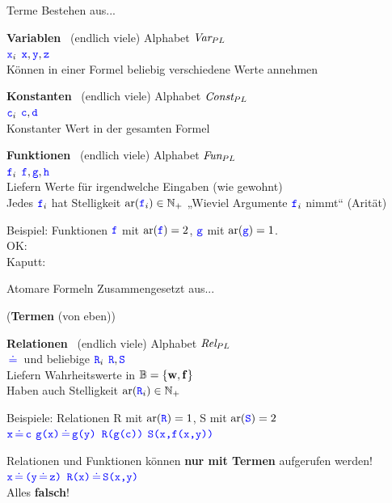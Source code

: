 \begin{frame}{Terme}
	Bestehen aus... \\
	\medskip
	
	\textbf{Variablen} \, (endlich viele) \quad Alphabet $\text{\itshape Var}_{PL}$ \\
	$\hbox{\textcolor{blue}{\texttt{x}}}_i$ \quad $\hbox{\textcolor{blue}{\texttt{x}}}, \hbox{\textcolor{blue}{\texttt{y}}}, \hbox{\textcolor{blue}{\texttt{z}}}$ \\
	Können in einer Formel beliebig verschiedene Werte annehmen \\
	\medskip \pause
	
	\textbf{Konstanten} \, (endlich viele) \quad Alphabet $\text{\itshape Const}_{PL}$ \\
	$\hbox{\textcolor{blue}{\texttt{c}}}_i$ \quad $\hbox{\textcolor{blue}{\texttt{c}}}, \hbox{\textcolor{blue}{\texttt{d}}}$ \\
	Konstanter Wert in der gesamten Formel \\
	\medskip \pause
	
	\textbf{Funktionen} \, (endlich viele) \quad Alphabet $\text{\itshape Fun}_{PL}$ \\
	$\hbox{\textcolor{blue}{\texttt{f}}}_i$ \quad $\hbox{\textcolor{blue}{\texttt{f}}}, \hbox{\textcolor{blue}{\texttt{g}}}, \hbox{\textcolor{blue}{\texttt{h}}}$ \\
	Liefern Werte für irgendwelche Eingaben (wie gewohnt) \\
	Jedes $\hbox{\textcolor{blue}{\texttt{f}}}_i$ hat Stelligkeit $\mathrm{ar}(\hbox{\textcolor{blue}{\texttt{f}}}_i) \in \mathbb{N}_+$ \quad „Wieviel Argumente $\hbox{\textcolor{blue}{\texttt{f}}}_i$ nimmt“ {\small (Arität)} \\
	\smallskip \pause
	
	Beispiel: 
	\quad Funktionen $\hbox{\textcolor{blue}{\texttt{f}}}$ mit $\mathrm{ar}(\hbox{\textcolor{blue}{\texttt{f}}}) = 2$, \quad $\hbox{\textcolor{blue}{\texttt{g}}}$ mit $\mathrm{ar}(\hbox{\textcolor{blue}{\texttt{g}}}) = 1$. \\ \pause
	\quad OK: \qquad {} \qquad {} \qquad {} \\
	\quad Kaputt: \qquad {} \qquad {} \qquad {} \qquad {}
\end{frame}

\begin{frame}{Atomare Formeln}
	Zusammengesetzt aus... \\
	\medskip
	
	(\textbf{Termen} (von eben)) \\
	\medskip
	
	\textbf{Relationen} \, (endlich viele) \quad Alphabet $\text{\itshape Rel}_{PL}$  \\
	$\pleq$ und beliebige $\hbox{\textcolor{blue}{\texttt{R}}}_i$ \quad $\hbox{\textcolor{blue}{\texttt{R}}}, \hbox{\textcolor{blue}{\texttt{S}}}$ \\
	Liefern Wahrheitswerte in $\mathbb{B} = \left\{\hbox{\textbf{w}}, \hbox{\textbf{f}}\right\}$ \\
	Haben auch Stelligkeit $\mathrm{ar}(\hbox{\textcolor{blue}{\texttt{R}}}_i) \in \mathbb{N}_+$ \\
	\medskip \pause
	
	Beispiele: \quad Relationen \word R mit $\mathrm{ar}(\hbox{\textcolor{blue}{\texttt{R}}}) = 1$, \quad \word S mit $\mathrm{ar}(\hbox{\textcolor{blue}{\texttt{S}}}) = 2$ \\
	\quad $\word x \pleq \word c$ \qquad $\word{g(x)} \pleq \word{g(y)}$ \qquad $\hbox{\textcolor{blue}{\texttt{R(g(c))}}}$ \qquad $\hbox{\textcolor{blue}{\texttt{S(x,f(x,y))}}}$
	\medskip \pause
	
	Relationen und Funktionen können \textbf{nur mit Termen} aufgerufen werden! \\
	\impl \quad $\word x \pleq \word{(}\word y \pleq \word z\word{)}$ \qquad {} \qquad {} \qquad $\word{R(x)} \pleq \word{S(x,y)}$ \\
	Alles \textbf{falsch}!
\end{frame}

